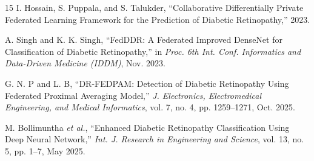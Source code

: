 \documentclass[10pt, conference]{IEEEtran}
\begin{document}
\begin{thebibliography}{15}
I. Hossain, S. Puppala, and S. Talukder, ``Collaborative Differentially Private
Federated Learning Framework for the Prediction of Diabetic Retinopathy,''
2023.

A. Singh and K. K. Singh, ``FedDDR: A Federated Improved DenseNet for
Classification of Diabetic Retinopathy,'' in \textit{Proc. 6th Int. Conf.
Informatics and Data-Driven Medicine (IDDM)}, Nov. 2023.

G. N. P and L. B, ``DR-FEDPAM: Detection of Diabetic Retinopathy Using
Federated Proximal Averaging Model,'' \textit{J. Electronics, Electromedical
Engineering, and Medical Informatics}, vol. 7, no. 4, pp. 1259--1271,
Oct. 2025.

M. Bollimuntha \textit{et al.}, ``Enhanced Diabetic Retinopathy Classification
Using Deep Neural Network,'' \textit{Int. J. Research in Engineering and
Science}, vol. 13, no. 5, pp. 1--7, May 2025.

\end{thebibliography}
\end{document}
